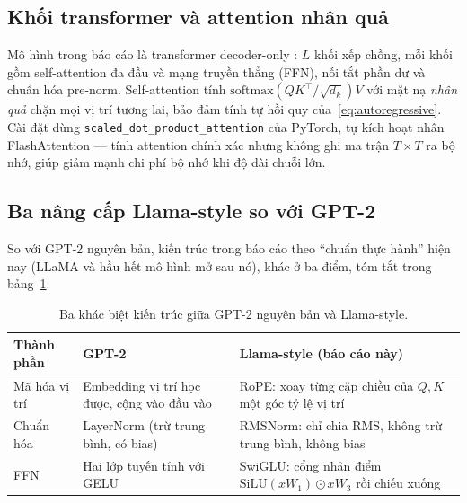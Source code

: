 \subsection{Khối transformer và attention nhân quả}

Mô hình trong báo cáo là transformer decoder-only
\autocite{vaswani2017attention,radford2019gpt2}: $L$ khối xếp chồng, mỗi khối
gồm self-attention đa đầu và mạng truyền thẳng (FFN), nối tắt phần dư và chuẩn
hóa pre-norm. Self-attention tính
$\mathrm{softmax}(QK^\top/\sqrt{d_k})V$ với mặt nạ \emph{nhân quả} chặn mọi vị
trí tương lai, bảo đảm tính tự hồi quy của~\eqref{eq:autoregressive}. Cài đặt
dùng \texttt{scaled\_dot\_product\_attention} của PyTorch, tự kích hoạt nhân
FlashAttention \autocite{dao2022flashattention} --- tính attention chính xác
nhưng không ghi ma trận $T \times T$ ra bộ nhớ, giúp giảm mạnh chi phí bộ nhớ
khi độ dài chuỗi lớn.

\subsection{Ba nâng cấp Llama-style so với GPT-2}

So với GPT-2 nguyên bản, kiến trúc trong báo cáo theo ``chuẩn thực hành''
hiện nay (LLaMA \autocite{touvron2023llama} và hầu hết mô hình mở sau nó),
khác ở ba điểm, tóm tắt trong bảng~\ref{tab:gpt2-vs-llama}.

\begin{table}[H]
	\centering
	\caption{Ba khác biệt kiến trúc giữa GPT-2 nguyên bản và Llama-style.}
	\label{tab:gpt2-vs-llama}
	\begin{tabularx}{\textwidth}{lXX}
		\hline
		\textbf{Thành phần} & \textbf{GPT-2} & \textbf{Llama-style (báo cáo này)} \\
		\hline
		Mã hóa vị trí & Embedding vị trí học được, cộng vào đầu vào & RoPE: xoay từng cặp chiều của $Q,K$ một góc tỷ lệ vị trí \\
		Chuẩn hóa & LayerNorm (trừ trung bình, có bias) & RMSNorm: chỉ chia RMS, không trừ trung bình, không bias \\
		FFN & Hai lớp tuyến tính với GELU & SwiGLU: cổng nhân điểm $\mathrm{SiLU}(xW_1)\odot xW_3$ rồi chiếu xuống \\
		\hline
	\end{tabularx}
\end{table}

